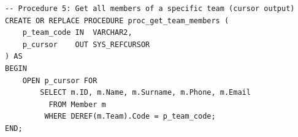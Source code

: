 \begin{lstlisting}
-- Procedure 5: Get all members of a specific team (cursor output)
CREATE OR REPLACE PROCEDURE proc_get_team_members (
    p_team_code IN  VARCHAR2,
    p_cursor    OUT SYS_REFCURSOR
) AS
BEGIN
    OPEN p_cursor FOR
        SELECT m.ID, m.Name, m.Surname, m.Phone, m.Email
          FROM Member m
         WHERE DEREF(m.Team).Code = p_team_code;
END;
\end{lstlisting}
